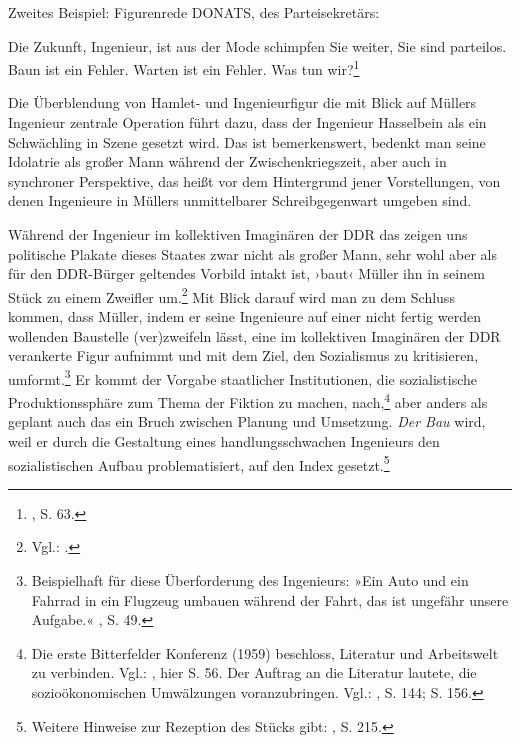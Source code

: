 \documentclass[%
	fontsize=10pt,%
	twoside,%
	headings=optiontoheadandtoc,%
	showtrims]{scrbook}
\renewenvironment{quote}{%
  \addmargin[\genericindent]{0pt}%
  \KOMAoptions{parskip=true}%
  \ifdim\parskip>0pt\else\addvspace{\intextsep}\fi
}{%
  \par
  \endaddmargin\vspace{\intextsep}
}
\renewcommand{\texttt}{\nohyphens} %
\begin{document}
\par Zweites Beispiel: Figurenrede DONATS, des Parteisekretärs:\begin{quote}
\par Die Zukunft, Ingenieur, ist aus der Mode \textendash{} schimpfen Sie \texttt{weiter}, Sie sind parteilos. Baun ist ein \texttt{Fehler}. Warten ist ein Fehler. Was tun wir?\footnote{\cite[][]{mueller1981a}, S. 63.} 
\end{quote}
\par Die Überblendung von Hamlet- und Ingenieurfigur \textendash{} die mit Blick auf Müllers Ingenieur zentrale Operation \textendash{} führt dazu, dass der Ingenieur Hasselbein als ein Schwächling in Szene gesetzt wird. Das ist bemerkenswert, bedenkt man seine Idolatrie als großer Mann während der Zwischenkriegszeit, aber auch in synchroner Perspektive, das heißt vor dem Hintergrund jener Vorstellungen, von denen Ingenieure in Müllers unmittelbarer Schreibgegenwart umgeben sind.\par Während der Ingenieur im kollektiven Imaginären der DDR \textendash{} das zeigen uns politische Plakate dieses Staates \textendash{} zwar nicht als großer Mann, sehr wohl aber als für den DDR-Bürger geltendes Vorbild intakt ist, ›baut‹ Müller ihn in seinem Stück zu einem Zweifler um.\footnote{Vgl.: \cite[][]{unknown-ddr}.}  Mit Blick darauf wird man zu dem Schluss kommen, dass Müller, indem er seine Ingenieure auf einer nicht fertig werden wollenden Baustelle (ver)zweifeln lässt, eine im kollektiven Imaginären der DDR verankerte Figur aufnimmt und mit dem Ziel, den Sozialismus zu kritisieren, umformt.\footnote{Beispielhaft für diese Überforderung des Ingenieurs: »Ein Auto und ein Fahrrad in ein Flugzeug umbauen während der Fahrt, das ist ungefähr unsere Aufgabe.« \cite[][]{mueller1981a}, S. 49.}  Er kommt der Vorgabe staatlicher Institutionen, die sozialistische Produktionssphäre zum Thema der Fiktion zu machen, nach,\footnote{Die erste Bitterfelder Konferenz (1959) beschloss, Literatur und Arbeitswelt zu verbinden. Vgl.: \cite[][]{schmitt1983b}, hier S. 56. Der Auftrag an die Literatur lautete, die sozioökonomischen Umwälzungen voranzubringen. Vgl.: \cite[][]{riewoldt1983a}, S. 144; S. 156.}  aber anders als geplant \textendash{} auch das ein Bruch zwischen Planung und Umsetzung. \emph{Der Bau} wird, weil er durch die Gestaltung eines handlungsschwachen Ingenieurs den sozialistischen Aufbau problematisiert, auf den Index gesetzt.\footnote{Weitere Hinweise zur Rezeption des Stücks gibt: \cite[][]{emmerich1996a}, S. 215.} 
\end{document}
